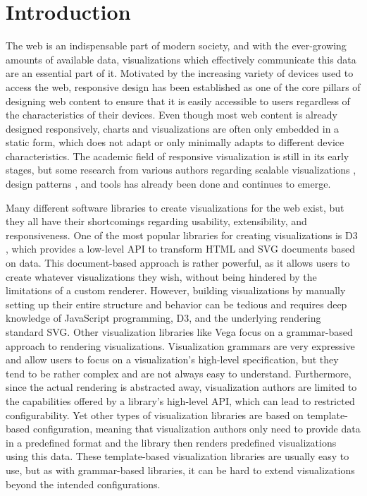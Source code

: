 \chapter{Introduction}
\label{chap:Introduction}

The web is an indispensable part of modern society, and with the
ever-growing amounts of available data, visualizations which
effectively communicate this data are an essential part of it.
Motivated by the increasing variety of devices used to access the web,
responsive design has been established as one of the core pillars of
designing web content to ensure that it is easily accessible to users
regardless of the characteristics of their devices. Even though most
web content is already designed responsively, charts and
visualizations are often only embedded in a static form, which does
not adapt or only minimally adapts to different device
characteristics. The academic field of responsive visualization is
still in its early stages, but some research from various authors
regarding scalable visualizations
\parencite{BuildingRespDataVisForTheWeb,LearningRespDataVis}, design
patterns
\parencite{RespVisTalk,RespVisPage,RespVis,TechniquesForFlexibleRespVisDesign,
  DesignPatternsTradeOffsRespVis}, and tools
\parencite{TechniquesForFlexibleRespVisDesign} has already been done
and continues to emerge.


Many different software libraries to create visualizations for the web
exist, but they all have their shortcomings regarding usability,
extensibility, and responsiveness. One of the most popular libraries
for creating visualizations is D3 \parencite{D3,D3JS}, which provides
a low-level API to transform HTML and SVG documents based on
data. This document-based approach is rather powerful, as it allows
users to create whatever visualizations they wish, without being
hindered by the limitations of a custom renderer. However, building
visualizations by manually setting up their entire structure and
behavior can be tedious and requires deep knowledge of JavaScript
programming, D3, and the underlying rendering standard SVG.
%
Other visualization libraries like Vega \parencite{Vega} focus on a
grammar-based approach to rendering visualizations. Visualization
grammars are very expressive and allow users to focus on a
visualization's high-level specification, but they tend to be rather
complex and are not always easy to understand. Furthermore, since the
actual rendering is abstracted away, visualization authors are limited
to the capabilities offered by a library's high-level API, which can
lead to restricted configurability.
%
Yet other types of visualization libraries are based on template-based
configuration, meaning that visualization authors only need to provide
data in a predefined format and the library then renders predefined
visualizations using this data. These template-based visualization
libraries are usually easy to use, but as with grammar-based
libraries, it can be hard to extend visualizations beyond the intended
configurations.


